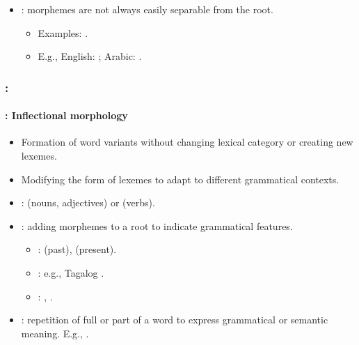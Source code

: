 \documentclass[xcolor=table]{beamer}
\begin{document}
\begin{frame}
\begin{itemize}
\begin{itemize}
			\item {}: morphemes are not always easily separable from the root.
			\begin{itemize}
				\item Examples: .
				\item E.g., English: ; Arabic: .
			\end{itemize}
		\end{itemize}
	\end{itemize}

\end{frame}

\begin{frame}
	\frametitle{\insertshortsubtitle: \insertsection}
	\framesubtitle{\insertsubsection: Inflectional morphology}
	
	\begin{itemize}
		\item Formation of word variants without changing lexical category or creating new lexemes.
		\item Modifying the form of lexemes to adapt to different grammatical contexts.
		\item {}:  (nouns, adjectives) or  (verbs).
		\item {}: adding morphemes to a root to indicate grammatical features.
		\begin{itemize}
			\item {}:  (past),  (present).
			\item {}: e.g., Tagalog .
			\item {}: , .
		\end{itemize}
		\item {}: repetition of full or part of a word to express grammatical or semantic meaning. 
		E.g., .
	\end{itemize}

\end{frame}
\end{document}
